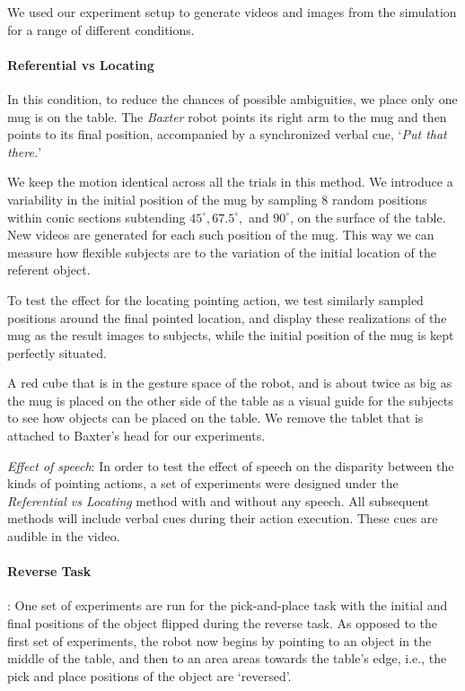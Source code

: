 We used our experiment setup to generate videos and images from the simulation for a range of different conditions.

\paragraph{Referential vs Locating}
In this condition, to reduce the chances of possible ambiguities, we place only one mug is on the table. The \textit{Baxter} robot points its right arm to the mug and then points to its final position, accompanied by a synchronized verbal cue, `\textit{Put that there.}'

We keep the motion identical across all the trials in this method. 
We introduce a variability in the initial position of the mug by sampling $8$ random positions within conic sections subtending $45^{\circ} , 67.5^{\circ}, $ and $90^{\circ}$, on the surface of the table. New videos are generated for each such position of the mug.
This way we can measure how flexible subjects are to the variation of the initial location of the referent object. 

To test the effect for the locating pointing action, we test similarly sampled positions around the final pointed location, and display these realizations of the mug as the result images to subjects, while the initial position of the mug is kept perfectly situated. 

A red cube that is in the gesture space of the robot, and is about twice as big as the mug is placed on the other side of the table as a visual guide for the subjects to see how objects can be placed on the table. We remove the tablet that is attached to Baxter's head for our experiments. 

\noindent\textit{Effect of speech}: In order to test the effect of speech on the disparity between the kinds of pointing actions, a set of experiments were designed under the \textit{Referential vs Locating} method with and without any speech. All subsequent methods will include verbal cues during their action execution. These cues are audible in the video.

\paragraph{Reverse Task}: One set of experiments are run for the pick-and-place task with the initial and final positions of the object flipped during the reverse task. As opposed to the first set of experiments, the robot now begins by pointing to an object in the middle of the table, and then to an area areas towards the table's edge, i.e., the pick and place positions of the object are `reversed'. 

